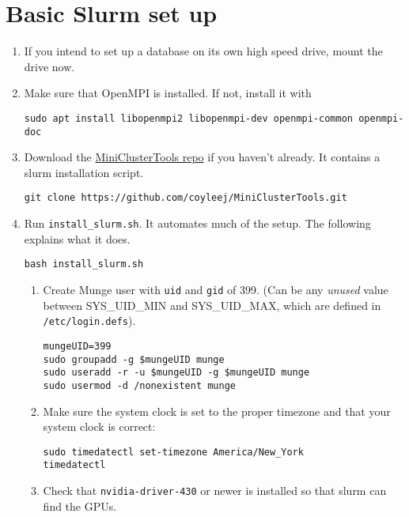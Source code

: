 \section{Basic Slurm set up} \label{sec:basicslurm}

\begin{enumerate}
\item If you intend to set up a database on its own high speed drive, mount the drive now. %

\item Make sure that OpenMPI is installed. If not, install it with

	\texttt{sudo apt install libopenmpi2 libopenmpi-dev openmpi-common openmpi-doc}

\item Download the \href{https://github.com/coyleej/MiniClusterTools}{MiniClusterTools repo}  if you haven't already. It contains a slurm installation script.

	\texttt{git clone https://github.com/coyleej/MiniClusterTools.git}

\item Run \texttt{install\_slurm.sh}. It automates much of the setup. The following explains what it does.

	\texttt{bash install\_slurm.sh}

	\begin{enumerate}
	\item Create Munge user with \texttt{uid} and \texttt{gid} of 399. (Can be any \emph{unused} value between SYS\_UID\_MIN and SYS\_UID\_MAX, which are defined in \texttt{/etc/login.defs}). 

		\texttt{mungeUID=399} \\
		\texttt{sudo groupadd -g \$mungeUID munge} \\
		\texttt{sudo useradd -r -u \$mungeUID -g \$mungeUID munge} \\
		\texttt{sudo usermod -d /nonexistent munge}

	\item Make sure the system clock is set to the proper timezone and that your system clock is correct:

		\texttt{sudo timedatectl set-timezone America/New\_York} \\
		\texttt{timedatectl}

	\item Check that \texttt{nvidia-driver-430} or newer is installed so that slurm can find the GPUs.


\end{enumerate}
\end{enumerate}
